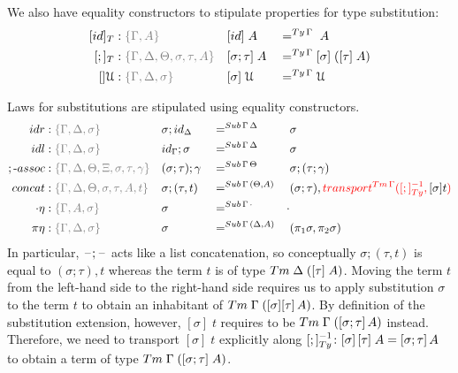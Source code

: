 \documentclass[a4paper,UKenglish,numberwithinsect,cleveref,thm-restate]{lipics-v2021}
\begin{document}
We also have equality constructors to stipulate properties for type substitution:
\begin{alignat*}{3}
  [\idS]_T & : \implicit{\Gamma, A}                               && [ \idS ] \;A         && =^{\Ty\,\Gamma}\;A \\
  [;]_T    & : \implicit{\Gamma, \Delta, \Theta, \sigma, \tau, A} && [ \sigma ; \tau ]\;A && =^{\Ty\,\Gamma} [ \sigma ]\;([ \tau ]\;A) \\
  []\UU      & : \implicit{\Gamma, \Delta, \sigma}                && [ \sigma ]\;\UU        && =^{\Ty\,\Gamma} \UU
\end{alignat*}

Laws for substitutions are stipulated using equality constructors.
\begin{alignat*}{5}
  \mathsf{idr}    & : \implicit{\Gamma, \Delta, \sigma} && {\sigma ; \idS_{\Delta}} && =^{\Sub\,\Gamma\,\Delta} && {\sigma} \\
  \mathsf{idl}    & : \implicit{\Gamma, \Delta, \sigma} && {\idS_{\Gamma} ; \sigma} && =^{\Sub\,\Gamma\,\Delta} && {\sigma} \\
  ;\text{-}\mathsf{assoc} & : \implicit{\Gamma, \Delta, \Theta, \Xi, \sigma, \tau, \gamma} && (\sigma ; \tau) ; \gamma && =^{\Sub\,\Gamma\,\Theta} &&  \sigma ; (\tau ; \gamma) \\
  \mathsf{concat} & : \implicit{\Gamma, \Delta, \Theta, \sigma, \tau, A, t} && \sigma ; (\tau , t)      && =^{\Sub\,\Gamma\,(\Theta, A)} &&  (\sigma ; \tau) , \alert{\transfib{\Tm\,\Gamma}{[;]_{\Ty}^{-1}}{\color{black}[ \sigma ] t}} \\
  \emptyctx\eta   & : \implicit{\Gamma, A, \sigma} && \sigma                   && =^{\Sub\,\Gamma\,\emptyctx} & \emptysub \\
  \pi\eta         & : \implicit{\Gamma, \Delta, \sigma} && \sigma                   && =^{\Sub\,\Gamma\,(\Delta, A)} &&  (\pi_1 \sigma, \pi_2 \sigma) \\
\end{alignat*}
In particular, $\mathord{\hspace{1pt}\text{--}\hspace{1pt}};\mathord{\hspace{1pt}\text{--}\hspace{1pt}}$ acts like a list concatenation, so conceptually $\sigma; (\tau, t)$ is equal to $(\sigma; \tau), t$ whereas the term $t$ is of type $\Tm\;\Delta\;([\tau]\;A)$. 
Moving the term $t$ from the left-hand side to the right-hand side requires us to apply substitution $\sigma$ to the term $t$ to obtain an inhabitant of $\Tm\;\Gamma\;([\sigma][\tau]\,A)$.
By definition of the substitution extension, however, $[\sigma]\;t$ requires to be $\Tm\;\Gamma\;([\sigma; \tau]\,A)$ instead.
Therefore, we need to transport $[\sigma]\;t$ explicitly along $[;]_{\Ty}^{-1}\colon [\sigma]\,[\tau]\;A = [\sigma;\tau]\,A$ to obtain a term of type $\Tm\;\Gamma\;([\sigma;\tau]\;A)$.
\end{document}
